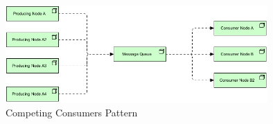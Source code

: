 \documentclass{bmcart}
\begin{document}








\begin{figure}[h]
  \includegraphics[width=10cm]{Media/Competing Consumers.jpg}
  \caption{Competing Consumers Pattern}
  \label{competingConsumer}
\end{figure}
\end{document}
